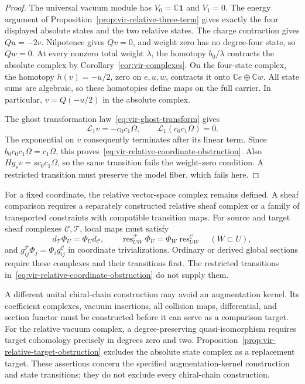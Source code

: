 \begin{proof}
The universal vacuum module has $V_0=\mathbb C\mathbf1$ and $V_1=0$.
The energy argument of Proposition~\ref{prop:vir-relative-three-term} gives exactly the four displayed absolute states and the two relative states.
The charge contraction gives $Qu=-2v$.
Nilpotence gives $Qv=0$, and weight zero has no degree-four state, so $Qw=0$.
At every nonzero total weight $\lambda$, the homotopy $b_0/\lambda$ contracts the absolute complex by Corollary~\ref{cor:vir-complexes}.
On the four-state complex, the homotopy $h(v)=-u/2$, zero on $e,u,w$, contracts it onto $\mathbb Ce\oplus\mathbb Cw$.
All state sums are algebraic, so these homotopies define maps on the full carrier.
In particular, $v=Q(-u/2)$ in the absolute complex.

The ghost transformation law~\eqref{eq:vir-ghost-transform} gives
\[
 \mathcal L_1v=-c_0c_1\Omega,
 \qquad \mathcal L_1(c_0c_1\Omega)=0.
\]
The exponential on $v$ consequently terminates after its linear term.
Since $b_0c_0c_1\Omega=c_1\Omega$, this proves~\eqref{eq:vir-relative-coordinate-obstruction}.
Also $Hg_sv=sc_0c_1\Omega$, so the same transition fails the weight-zero condition.
A restricted transition must preserve the model fiber, which fails here.
\end{proof}

For a fixed coordinate, the relative vector-space complex remains defined.
A sheaf comparison requires a separately constructed relative sheaf complex or a family of transported constraints with compatible transition maps.
For source and target sheaf complexes $\mathcal C,\mathcal T$, local maps must satisfy
\[
 d_{\mathcal T}\Phi_U=\Phi_Ud_{\mathcal C},\qquad
 \operatorname{res}^{\mathcal T}_{UW}\Phi_U
 =\Phi_W\operatorname{res}^{\mathcal C}_{UW}\quad(W\subset U),
\]
and $g^{\mathcal T}_{ij}\Phi_j=\Phi_i g^{\mathcal C}_{ij}$ in coordinate trivializations.
Ordinary or derived global sections require these complexes and their transitions first.
The restricted transitions in~\eqref{eq:vir-relative-coordinate-obstruction} do not supply them.

A different unital chiral-chain construction may avoid an augmentation kernel.
Its coefficient complexes, vacuum insertions, all collision maps, differential, and section functor must be constructed before it can serve as a comparison target.
For the relative vacuum complex, a degree-preserving quasi-isomorphism requires target cohomology precisely in degrees zero and two.
Proposition~\ref{prop:vir-relative-target-obstruction} excludes the absolute state complex as a replacement target.
These assertions concern the specified augmentation-kernel construction and state transitions; they do not exclude every chiral-chain construction.

